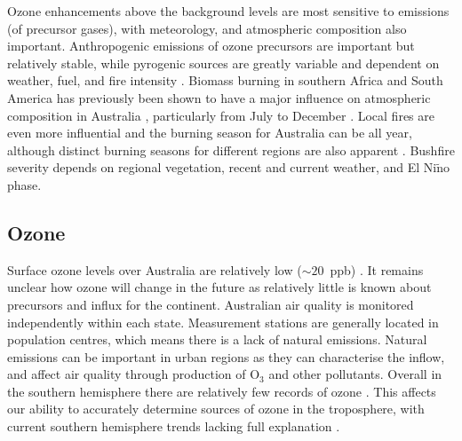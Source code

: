   Ozone enhancements above the background levels are most sensitive to emissions (of precursor gases), with meteorology, and atmospheric composition also important.
  Anthropogenic emissions of ozone precursors are important but relatively 
  stable, while pyrogenic sources are greatly variable and dependent on 
  weather, fuel, and fire intensity \parencite[e.g.,][]{Lawson2017}. 
  Biomass burning in southern Africa and South America has previously been shown to have a major influence on atmospheric composition in Australia \parencite{Oltmans2001, Gloudemans2006, Edwards2006}, particularly from July to December \parencite{Pak2003, Liu2016}.
  Local fires are even more influential and the burning season for Australia can be all year, although distinct burning seasons for different regions are also apparent \parencite{Smith2007}.
  Bushfire severity depends on regional vegetation, recent and current weather, and El Ni$\tilde{\textrm{n}}$o phase.
  
  
  \subsection{Ozone}
    Surface ozone levels over Australia are relatively low ($\sim20$~ppb) \parencite{Young2018}.
    It remains unclear how ozone will change in the future as relatively little is known about precursors and influx for the continent.
    Australian air quality is monitored independently within each state. %
    Measurement stations are generally located in population centres, which means there is a lack of natural emissions.%
    Natural emissions can be important in urban regions as they can characterise the inflow, and affect air quality through production of O$_3$ and other pollutants.
    Overall in the southern hemisphere there are relatively few records of 
    ozone \parencite{Huang2018}.
    This affects our ability to accurately determine sources of ozone in the 
    troposphere, with current southern hemisphere trends lacking full 
    explanation \parencite{Zeng2017}. 
    
